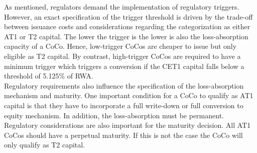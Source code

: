 As mentioned, regulators demand the implementation of regulatory triggers. However, an exact specification of the trigger threshold is driven by the trade-off between issuance costs and considerations regarding the categorization as either AT1 or T2 capital. The lower the trigger is the lower is also the loss-absorption capacity of a CoCo. Hence, low-trigger CoCos are cheaper to issue but only eligible as T2 capital. By contrast, high-trigger CoCos are required to have a minimum trigger which triggers a conversion if the CET1 capital falls below a threshold of 5.125\% of RWA. \citep{avdjiev2013cocos}\\

Regulatory requirements also influence the specification of the loss-absorption mechanism and maturity. One important condition for a CoCo to qualify as AT1 capital is that they have to incorporate a full write-down or full conversion to equity mechanism. \citep{RePEc:zbw:bubdps:282014} In addition, the loss-absorption must be permanent. Regulatory considerations are also important for the maturity decision. All AT1 CoCos should have a perpetual maturity. If this is not the case the CoCo will only qualify as T2 capital. \citep{avdjiev2013cocos}
